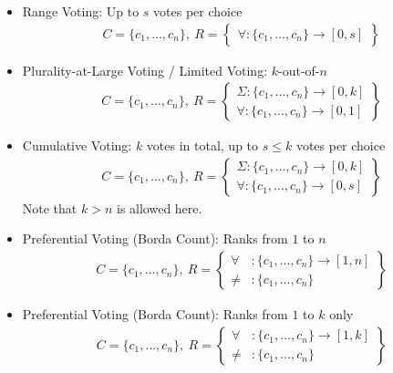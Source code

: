 \documentclass[bibtotoc,halfparskip,oneside]{scrreprt}
\begin{document}
\begin{itemize}
\item Range Voting: Up to $s$ votes per choice
\begin{align*}
	C=\{c_1,\ldots,c_n\},~ 
	R=\left\{\begin{aligned}\forall:\{c_1,\ldots,c_n\}\rightarrow[0,s]\end{aligned}\right\}
\end{align*}

\item Plurality-at-Large Voting / Limited Voting: $k$-out-of-$n$
\begin{align*}
	C=\{c_1,\ldots,c_n\},~ 
	R=\left\{\begin{aligned}\Sigma:\{c_1,\ldots,c_n\}\rightarrow[0,k] \\ \forall:\{c_1,\ldots,c_n\}\rightarrow[0,1]\end{aligned}\right\}
\end{align*}

\item Cumulative Voting: $k$ votes in total, up to $s\leq k$ votes per choice
\begin{align*}
	C=\{c_1,\ldots,c_n\},~ 
	R=\left\{\begin{aligned}\Sigma:\{c_1,\ldots,c_n\}\rightarrow[0,k] \\ \forall:\{c_1,\ldots,c_n\}\rightarrow[0,s]\end{aligned}\right\}
\end{align*}
Note that $k>n$ is allowed here.

\item Preferential Voting (Borda Count): Ranks from $1$ to $n$
\begin{align*}
	C=\{c_1,\ldots,c_n\},~ 
	R=\left\{\begin{aligned}\forall&:\{c_1,\ldots,c_n\}\rightarrow[1,n] \\ \not=&:\{c_1,\ldots,c_n\} \end{aligned}\right\}
\end{align*}
\item Preferential Voting (Borda Count): Ranks from $1$ to $k$ only
\begin{align*}
	C=\{c_1,\ldots,c_n\},~ 
	R=\left\{\begin{aligned}\forall&:\{c_1,\ldots,c_n\}\rightarrow[1,k] \\ \not=&:\{c_1,\ldots,c_n\} \end{aligned}\right\}
\end{align*}


\end{itemize}
\end{document}
